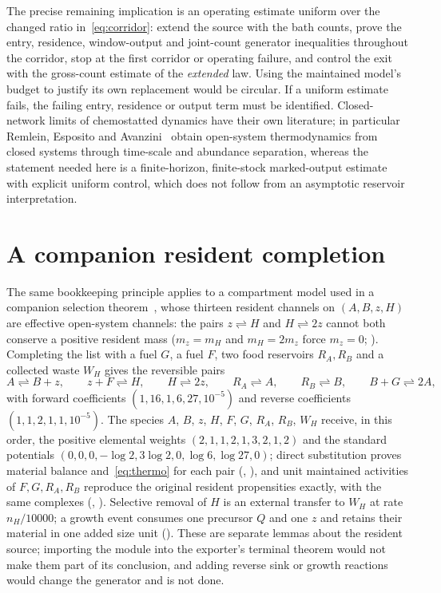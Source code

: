 \documentclass[11pt,a4paper]{article}
\theoremstyle{plain}
\theoremstyle{definition}
\theoremstyle{remark}
\begin{document}
The precise remaining implication is an operating estimate uniform over the changed ratio in~\eqref{eq:corridor}: extend the source with the bath counts, prove the entry, residence, window-output and joint-count generator inequalities throughout the corridor, stop at the first corridor or operating failure, and control the exit with the gross-count estimate of the \emph{extended} law. Using the maintained model's budget to justify its own replacement would be circular. If a uniform estimate fails, the failing entry, residence or output term must be identified. Closed-network limits of chemostatted dynamics have their own literature; in particular Remlein, Esposito and Avanzini~\citep{remlein2026} obtain open-system thermodynamics from closed systems through time-scale and abundance separation, whereas the statement needed here is a finite-horizon, finite-stock marked-output estimate with explicit uniform control, which does not follow from an asymptotic reservoir interpretation.

\section{A companion resident completion}\label{sec:resident}

The same bookkeeping principle applies to a compartment model used in a companion selection theorem~\citep{batch2026}, whose thirteen resident channels on $(A,B,z,H)$ are effective open-system channels: the pairs $z\rightleftharpoons H$ and $H\rightleftharpoons2z$ cannot both conserve a positive resident mass ($m_z=m_H$ and $m_H=2m_z$ force $m_z=0$; ). Completing the list with a fuel $G$, a fuel $F$, two food reservoirs $R_A,R_B$ and a collected waste $W_H$ gives the reversible pairs
\[
 A\rightleftharpoons B+z,\qquad z+F\rightleftharpoons H,\qquad H\rightleftharpoons2z,\qquad
 R_A\rightleftharpoons A,\qquad R_B\rightleftharpoons B,\qquad B+G\rightleftharpoons2A,
\]
with forward coefficients $(1,16,1,6,27,10^{-5})$ and reverse coefficients $(1,1,2,1,1,10^{-5})$. The species $A$, $B$, $z$, $H$, $F$, $G$, $R_A$, $R_B$, $W_H$ receive, in this order, the positive elemental weights $(2,1,1,2,1,3,2,1,2)$ and the standard potentials $(0,0,0,-\log2,3\log2,0,\log6,\log27,0)$; direct substitution proves material balance and~\eqref{eq:thermo} for each pair (, ), and unit maintained activities of $F,G,R_A,R_B$ reproduce the original resident propensities exactly, with the same complexes (, ). Selective removal of $H$ is an external transfer to $W_H$ at rate $n_H/10000$; a growth event consumes one precursor $Q$ and one $z$ and retains their material in one added size unit (). These are separate lemmas about the resident source; importing the module into the exporter's terminal theorem would not make them part of its conclusion, and adding reverse sink or growth reactions would change the generator and is not done.
\end{document}
